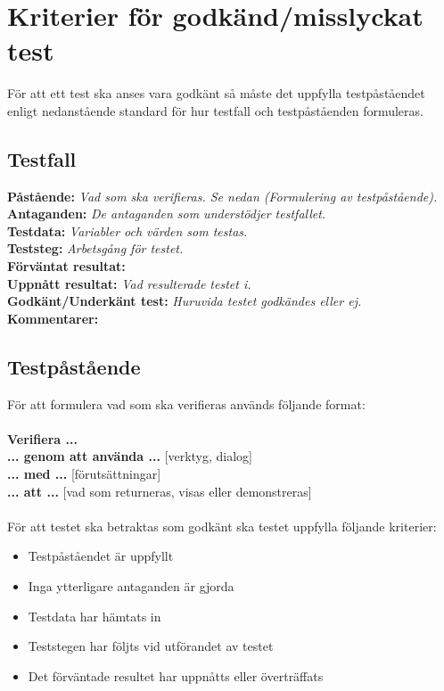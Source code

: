 \section{Kriterier för godkänd/misslyckat test}
För att ett test ska anses vara godkänt så måste det uppfylla testpåståendet enligt nedanstående standard för hur testfall och testpåståenden formuleras.
\subsection{Testfall}
\textbf{Påstående:} \textit{Vad som ska verifieras. Se nedan (Formulering av testpåstående).}\\
\textbf{Antaganden:} \textit{De antaganden som understödjer testfallet.}\\
\textbf{Testdata: } \textit{Variabler och värden som testas.}\\
\textbf{Teststeg: } \textit{Arbetsgång för testet.}\\
\textbf{Förväntat resultat: } \\
\textbf{Uppnått resultat: } \textit{Vad resulterade testet i.}\\
\textbf{Godkänt/Underkänt test:} \textit{Huruvida testet godkändes eller ej.}\\
\textbf{Kommentarer:} 
\subsection{Testpåstående}
För att formulera vad som ska verifieras används följande format: \\
\\
\textbf{Verifiera ...} \\
\textbf{... genom att använda ...} [verktyg, dialog] \\
\textbf{... med ...} [förutsättningar] \\
\textbf{... att ...} [vad som returneras, visas eller demonstreras]
\\ \\
För att testet ska betraktas som godkänt ska testet uppfylla följande kriterier:
\begin{itemize}
\item Testpåståendet är uppfyllt
\item Inga ytterligare antaganden är gjorda
\item Testdata har hämtats in
\item Teststegen har följts vid utförandet av testet
\item Det förväntade resultet har uppnåtts eller överträffats
\end{itemize}


